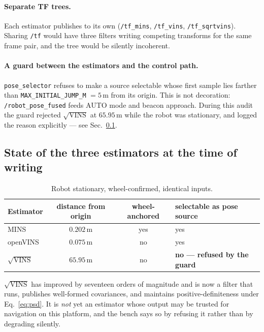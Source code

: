 \paragraph{Separate TF trees.} Each estimator publishes to its own
(\texttt{/tf\_mins}, \texttt{/tf\_vins}, \texttt{/tf\_sqrtvins}). Sharing
\texttt{/tf} would have three filters writing competing transforms for the same
frame pair, and the tree would be silently incoherent.

\paragraph{A guard between the estimators and the control path.}
\texttt{pose\_selector} refuses to make a source selectable whose first sample
lies farther than \texttt{MAX\_INITIAL\_JUMP\_M} $=5$\,m from its origin. This
is not decoration: \texttt{/robot\_pose\_fused} feeds AUTO mode and beacon
approach. During this audit the guard rejected $\sqrt{\text{VINS}}$ at
$65.95$\,m while the robot was stationary, and logged the reason
explicitly --- see Sec.~\ref{ssec:etat}.

\subsection{State of the three estimators at the time of writing}
\label{ssec:etat}

\begin{table}[htbp]
\centering
\caption{Robot stationary, wheel-confirmed, identical inputs.}
\label{tab:etat3}
\begin{tabular}{lccl}
\hline
Estimator & distance from origin & wheel-anchored & selectable as pose source \\
\hline
MINS                 & $0.202$\,m  & yes & yes \\
openVINS             & $0.075$\,m  & no  & yes \\
$\sqrt{\text{VINS}}$ & $65.95$\,m  & no  & \textbf{no --- refused by the guard} \\
\hline
\end{tabular}
\end{table}

$\sqrt{\text{VINS}}$ has improved by seventeen orders of magnitude and is now a
filter that runs, publishes well-formed covariances, and maintains
positive-definiteness under Eq.~\eqref{eq:psd}. It is \emph{not} yet an
estimator whose output may be trusted for navigation on this platform, and the
bench says so by refusing it rather than by degrading silently.

